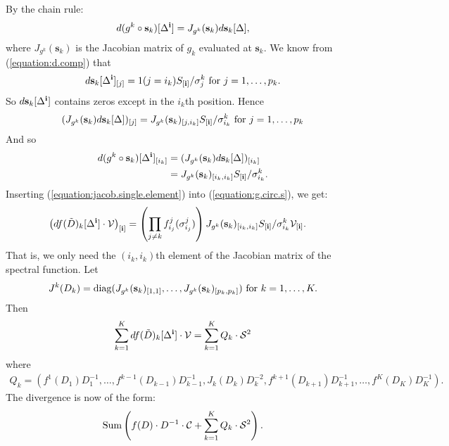 By the chain rule:
\begin{align*}
d(g^k \circ \mathbf{s}_k)[\Delta^{\bf i}] = J_{g^k}(\mathbf{s}_k) d\mathbf{s}_k[\Delta],
\end{align*}
where $J_{g^k}(\mathbf{s}_k)$ is the Jacobian matrix of $g_k$
evaluated at $\mathbf{s}_k$. We know from (\ref{equation:d.comp}) that
\begin{align*}
d\mathbf{s}_{k}[\Delta^{\bf i}]_{[j]} = 1(j = i_k)S_{[{\bf i}]}
/ \sigma_j^k \text{ for } j = 1,\ldots,p_k.
\end{align*}
So $d\mathbf{s}_k[\Delta^{\bf i}]$ contains zeros except in the $i_k$th position. Hence
\begin{align*}
(J_{g^k}(\mathbf{s}_k) d\mathbf{s}_k[\Delta])_{[j]} = J_{g^k}(\mathbf{s}_k)_{[j,i_k]}S_{[{\bf i}]}
/ \sigma_{i_k}^k \text{ for } j = 1,\ldots,p_k
\end{align*}
And so
\begin{align}
d(g^k \circ \mathbf{s}_k)[\Delta^{\bf i}]_{[i_k]} &=
(J_{g^k}(\mathbf{s}_k) d\mathbf{s}_k[\Delta])_{[i_k]}\nonumber\\
&= J_{g^k}(\mathbf{s}_k)_{[i_k,i_k]}S_{[{\bf i}]}/\sigma_{i_k}^k. \label{equation:jacob.single.element}
\end{align}
Inserting (\ref{equation:jacob.single.element}) into
(\ref{equation:g.circ.s}), we get:
\begin{align*}
\left(df(\tilde{D})_k[\Delta^{\bf i}] \cdot
  \mathcal{V}\right)_{[\mathbf{i}]} &= \left(\prod_{j\neq
    k}f_{i_j}^j(\sigma_{i_j}^j)\right)
J_{g^k}(\mathbf{s}_k)_{[i_k,i_k]}S_{[{\bf
    i}]}/\sigma_{i_k}^k\mathcal{V}_{[{\bf i}]}.
\end{align*}
That is, we only need the $(i_k,i_k)$th element of the Jacobian matrix
of the spectral function. Let
\begin{align*}
J^k(D_k) =
\operatorname*{diag}(J_{g^k}(\mathbf{s}_k)_{[1,1]},\ldots,J_{g^k}(\mathbf{s}_k)_{[p_k,p_k]})
\text{ for } k=1,\ldots,K.
\end{align*}
Then
\begin{align*}
\sum_{k=1}^K df(\tilde{D})_k[\Delta^{\bf i}] \cdot \mathcal{V} = \sum_{k=1}^K Q_k \cdot \mathcal{S}^2
\end{align*}
where
\begin{align*}
Q_k = (f^1(D_1)D_1^{-1},\ldots,f^{k-1}(D_{k-1})D_{k-1}^{-1},J_k(D_k)D_{k}^{-2},f^{k+1}(D_{k+1})D_{k+1}^{-1},\ldots,f^K(D_K)D_{K}^{-1}).
\end{align*}
The divergence is now of the form:
\begin{align*}
\operatorname*{Sum}\left(f(D) \cdot D^{-1}\cdot \mathcal{C} + \sum_{k=1}^KQ_k \cdot \mathcal{S}^2\right).
\end{align*}

